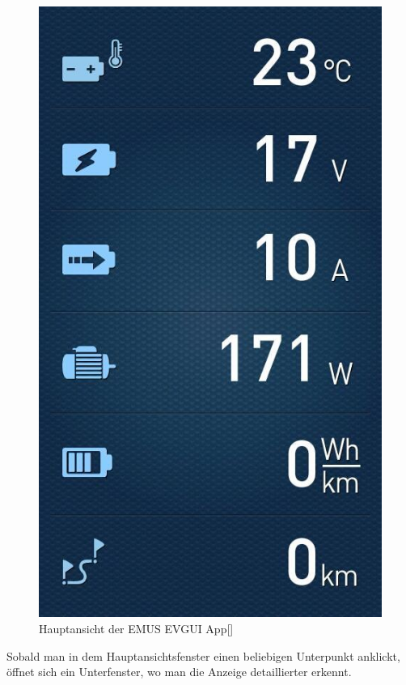 \begin{figure}[H]
	\begin{center}
		\includegraphics[scale=0.4]{figures/Akku/EMUSAPP1.jpg}
		\caption{Hauptansicht der EMUS EVGUI App[\cite{HauptansichtApp}]}
		\label{fig: Hauptansicht der EMUS EVGUI App}
	\end{center}
\end{figure}

\newpage

Sobald man in dem Hauptansichtsfenster einen beliebigen Unterpunkt anklickt, öffnet sich ein Unterfenster, wo man die Anzeige detaillierter erkennt.

